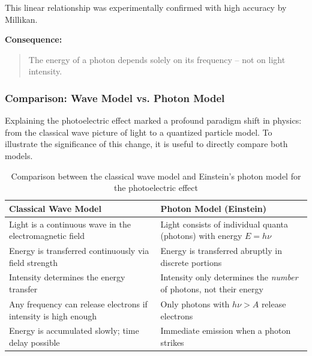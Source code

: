 This linear relationship was experimentally confirmed with high accuracy by Millikan.

\textbf{Consequence:}

\begin{quote}
	The energy of a photon depends solely on its frequency – not on light intensity.
\end{quote}

\subsubsection{Comparison: Wave Model vs. Photon Model}

Explaining the photoelectric effect marked a profound paradigm shift in physics: from the classical wave picture of light to a quantized particle model. To illustrate the significance of this change, it is useful to directly compare both models.

\vspace{1em}
\begin{table}[H]
	\centering
	\begin{tabular}{|p{4.75cm}|p{4.75cm}|}
		\hline
		\textbf{Classical Wave Model} & \textbf{Photon Model (Einstein)} \\
		\hline
		Light is a continuous wave in the electromagnetic field & Light consists of individual quanta (photons) with energy \( E = h\nu \) \\
		\hline
		Energy is transferred continuously via field strength & Energy is transferred abruptly in discrete portions \\
		\hline
		Intensity determines the energy transfer & Intensity only determines the \emph{number} of photons, not their energy \\
		\hline
		Any frequency can release electrons if intensity is high enough & Only photons with \( h\nu > A \) release electrons \\
		\hline
		Energy is accumulated slowly; time delay possible & Immediate emission when a photon strikes \\
		\hline
	\end{tabular}
	\caption{Comparison between the classical wave model and Einstein’s photon model for the photoelectric effect}
	\label{tab:vergleich_photoeffekt}
\end{table}

